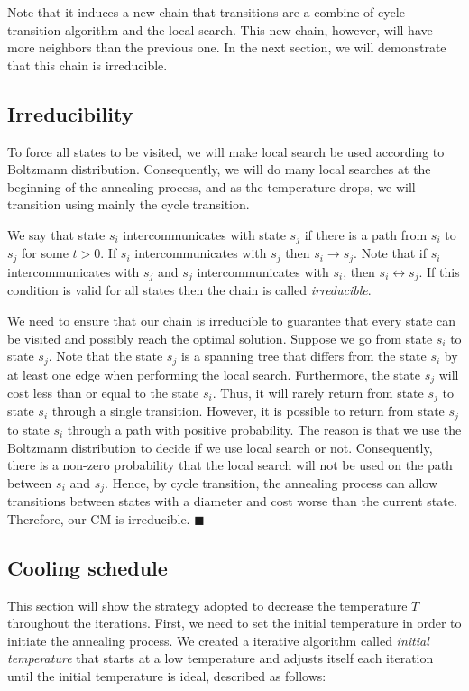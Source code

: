 \documentclass[12pt]{article}
\renewcommand{\qedsymbol}{$\blacksquare$}
\begin{document}
    
\vspace{0.2cm}

Note that it induces a new chain that transitions are a combine of cycle transition algorithm and the local search. This new chain, however, will have more neighbors than the previous one. In the next section, we will demonstrate that this chain is irreducible.

\subsection{Irreducibility}

To force all states to be visited, we will make local search be used according to Boltzmann distribution. Consequently, we will do many local searches at the beginning of the annealing process, and as the temperature drops, we will transition using mainly the cycle transition.

We say that state $s_i$ intercommunicates with state $s_j$ if there is a path from $s_i$ to $s_j$ for some $t>0$. If $s_i$ intercommunicates with $s_j$ then $s_i \rightarrow s_j$. Note that if $ s_i $ intercommunicates with $ s_j $ and $ s_j $ intercommunicates with $ s_i $, then $s_i\leftrightarrow s_j$. If this condition is valid for all states then the chain is called \emph{irreducible}.

We need to ensure that our chain is irreducible to guarantee that every state can be visited and possibly reach the optimal solution. Suppose we go from state $s_i$ to state $s_j$. Note that the state $s_j$ is a spanning tree that differs from the state $s_i$ by at least one edge when performing the local search. Furthermore, the state $s_j$ will cost less than or equal to the state $s_i$. Thus, it will rarely return from state $s_j$ to state $s_i$ through a single transition. However, it is possible to return from state $s_j$ to state $s_i$ through a path with positive probability. The reason is that we use the Boltzmann distribution to decide if we use local search or not. Consequently, there is a non-zero probability that the local search will not be used on the path between $s_i$ and $s_j$. Hence, by cycle transition, the annealing process can allow transitions between states with a diameter and cost worse than the current state. Therefore, our CM is irreducible. \qedsymbol


\subsection{Cooling schedule}
This section will show the strategy adopted to decrease the temperature $T$ throughout the iterations. First, we need to set the initial temperature in order to initiate the annealing process. We created a iterative algorithm called \emph{initial temperature} that starts at a low temperature and adjusts itself each iteration until the initial temperature is ideal, described as follows:
\end{document}
